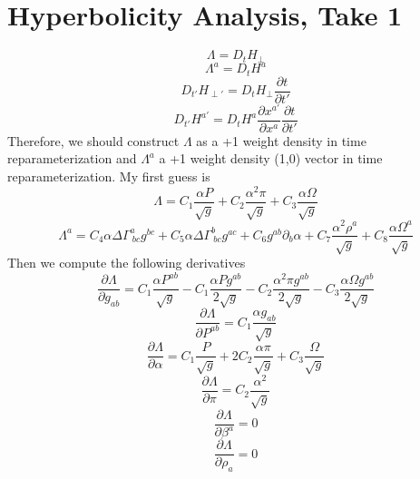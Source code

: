 \documentclass{article}
\begin{document}
\section{Hyperbolicity Analysis, Take 1}
\[
\Lambda = D_{t}H_{\perp}
\]
\[
\Lambda^{a} = D_{t}H^{a}
\]
\[
D_{t'}H_{\perp'} = D_{t}H_{\perp}\frac{\partial t}{\partial t'}
\]
\[
D_{t'}H^{a'} = D_{t}H^{a}\frac{\partial x^{a'}}{\partial x^{a}}\frac{\partial t}{\partial t'}
\]
Therefore, we should construct $\Lambda$ as a +1 weight density in time reparameterization and $\Lambda^{a}$ a +1 weight density (1,0) vector in time reparameterization. My first guess is
\[
\Lambda = C_{1}\frac{\alpha P}{\sqrt{g}} + C_{2}\frac{\alpha^{2}\pi}{\sqrt{g}} + C_{3}\frac{\alpha \Omega}{\sqrt{g}}
\]
\[
\Lambda^{a} = C_{4}\alpha \Delta \Gamma^{a}_{~bc}g^{bc} + C_{5}\alpha \Delta \Gamma^{b}_{~bc}g^{ac} + C_{6}g^{ab}\partial_{b}\alpha + C_{7}\frac{\alpha^{2}\rho^{a}}{\sqrt{g}} + C_{8}\frac{\alpha \Omega^{a}}{\sqrt{g}}
\]
Then we compute the following derivatives
\[
\frac{\partial \Lambda}{\partial g_{ab}} = C_{1}\frac{\alpha P^{ab}}{\sqrt{g}} - C_{1}\frac{\alpha P g^{ab}}{2\sqrt{g}} - C_{2}\frac{\alpha^{2} \pi g^{ab}}{2\sqrt{g}} - C_{3}\frac{\alpha \Omega g^{ab}}{2\sqrt{g}}
\]
\[
\frac{\partial \Lambda}{\partial P^{ab}} = C_{1}\frac{\alpha g_{ab}}{\sqrt{g}}
\]
\[
\frac{\partial \Lambda}{\partial \alpha} = C_{1}\frac{P}{\sqrt{g}} + 2C_{2}\frac{\alpha \pi}{\sqrt{g}} + C_{3}\frac{\Omega}{\sqrt{g}}
\]
\[
\frac{\partial \Lambda}{\partial \pi} = C_{2}\frac{\alpha^{2}}{\sqrt{g}}
\]
\[
\frac{\partial \Lambda}{\partial \beta^{a}} = 0
\]
\[
\frac{\partial \Lambda}{\partial \rho_{a}} = 0
\]
\end{document}
